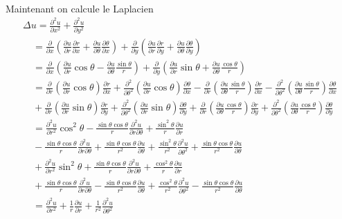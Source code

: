 \documentclass[12pt,a4paper]{article}
\newcommand{\dr}{\frac{\partial}{\partial r}}
\newcommand{\doo}{\frac{\partial^2}{\partial \theta^2}}
\newcommand{\drx}{\frac{\partial r}{\partial x}}
\newcommand{\dry}{\frac{\partial r}{\partial y}}
\newcommand{\dox}{\frac{\partial \theta}{\partial x}}
\newcommand{\doy}{\frac{\partial \theta}{\partial y}}
\newcommand{\dur}{\frac{\partial u}{\partial r}}
\newcommand{\duo}{\frac{\partial u}{\partial \theta}}
\newcommand{\dx}{\frac{\partial }{\partial x}}
\newcommand{\dy}{\frac{\partial }{\partial y}}
\newcommand{\duro}{\frac{\partial^2 u}{\partial r\partial \theta}}
\newcommand{\durr}{\frac{\partial^2 u}{\partial r^2}}
\newcommand{\duoo}{\frac{\partial^2 u}{\partial \theta^2}}
\newcommand{\sincos}{\sin\theta\cos\theta}
\begin{document}
\begin{enumerate}
$$\begin{array}{l}
\end{array}$$
Maintenant on calcule le Laplacien
$$
\begin{array}{l}
	\Delta u=\displaystyle\frac{\partial^2 u}{\partial x^2}+\frac{\partial^2 u}{\partial y^2}\\
	\quad=\displaystyle\dx(\dur\drx+\duo\dox)+\dy(\dur\dry+\duo\doy)\\
	\quad=\displaystyle\dx(\dur\cos\theta-\duo \frac{\sin\theta}{r})+\dy(\dur \sin\theta+\duo \frac{\cos\theta}{r})\\
	\quad=\displaystyle\dr(\dur \cos\theta)\drx+\doo(\dur\cos\theta)\dox-\dr(\duo\frac{\sin\theta}{r})\drx-\doo(\duo\frac{\sin \theta}{r})\dox\\
	\quad+\displaystyle\dr(\dur\sin\theta)\dry+\doo(\dur\sin\theta)\doy+\dr(\duo\frac{\cos\theta}{r})\dry+\doo(\duo\frac{\cos\theta}{r})\doy\\
	\quad
        =\displaystyle\durr\cos^2\theta-\frac{\sincos}{r}\duro+\frac{\sin^2
          \theta}{r}\dur\\
\quad \displaystyle-\frac{\sincos}{r}\duro+\frac{\sincos}{r^2}\duo+\frac{\sin^2\theta}{r^2}\duoo+\frac{\sincos}{r^2}\duo\\
	 \quad+\displaystyle\durr
         \sin^2\theta+\frac{\sincos}{r}\duro+\frac{\cos^2\theta}{r}\dur\\
\quad \displaystyle+\frac{\sincos }{r}\duro -\frac{\sincos}{r^2}\duo+\frac{\cos^2\theta}{r^2}\duoo -\frac{\sincos}{r^2}\duo\\
	\quad=\displaystyle\durr+\frac{1}{r}\dur+\frac{1}{r^2}\duoo
	\end{array}
$$
\end{enumerate}
\end{document}
